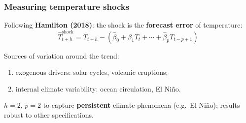 \documentclass[xcolor=x11names,compress,aspectratio=169]{beamer}%
\makeatletter
\newenvironment{stepenumeratewithalert}{\begin{enumerate}[<+-| alert@+>]}{\end{enumerate}}
\newenvironment{stepitemizewithalert}{\begin{itemize}[<+-| alert@+>]}{\end{itemize} }
\renewenvironment{itemize}{\begin{compactitemize}[<+-| alert@+>]}{\end{compactitemize}}
\renewenvironment{stepitemizewithalert}{\begin{compactitemize}[<+-| alert@+>]}{\end{compactitemize}}
\renewenvironment{stepitemizewithalert}{\begin{itemize}}{\end{itemize}}
\renewenvironment{stepenumeratewithalert}{\begin{enumerate}}{\end{enumerate}}
\makeatother
\begin{document}
\begin{frame}%
%

\frametitle{Measuring temperature shocks}%


\begin{stepitemizewithalert}
\item Following \textbf{Hamilton (2018)}: the shock is the \textbf{forecast error}
of temperature:%
\[
\widehat{T}_{t+h}^{\text{shock}}=T_{t+h}-\left(  \hat{\beta}_{0}+\hat{\beta}_{1}T_{t}+\cdots+\hat{\beta}_{p}T_{t-p+1}\right)
\]%
\vspace{1.5ex}%


\item Sources of variation around the trend:
\begin{stepenumeratewithalert}
\item exogenous drivers: solar cycles, volcanic eruptions;%
\vspace{1ex}%


\item internal climate variability: ocean circulation, El Ni\~{n}o.
\end{stepenumeratewithalert}%
\vspace{1.5ex}%


\item $h=2$, $p=2$ to capture \textbf{persistent} climate phenomena (e.g.\ El
Ni\~{n}o); results robust to other specifications.
\end{stepitemizewithalert}

%

\transboxout
\end{frame}%
%
\end{document}
